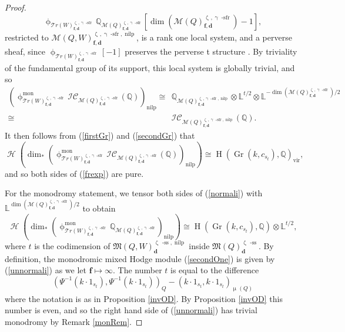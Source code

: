 \documentclass[a4paper,10pt]{amsart}
\newcommand{\dd}{\mathbf{d}}
\newcommand{\ff}{\mathbf{f}}
\newcommand{\LL}{\mathbb{L}}
\newcommand{\QQ}{\mathbb{Q}}
\DeclareMathOperator{\sfr}{-sfr}
\newcommand{\WW}{\mathcal{T}r(W)}
\newcommand{\Mst}{\mathfrak{M}}
\newcommand{\Msp}{\mathcal{M}}
\newcommand{\ICS}{\mathcal{IC}}
\newcommand{\phim}[1]{\phi^{\mon}_{#1}}
\renewcommand{\gamma}{\upgamma}
\renewcommand{\zeta}{\upzeta}
\renewcommand{\phi}{\upphi}
\renewcommand{\mu}{\upmu}
\DeclareMathOperator{\sst}{-ss}
\DeclareMathOperator{\nilp}{nilp}
\DeclareMathOperator{\mon}{mon}
\DeclareMathOperator{\Gr}{Gr}
\DeclareMathOperator{\Ss}{\overline{s}}
\DeclareMathOperator{\vir}{vir}
\DeclareMathOperator{\Ho}{\mathcal{H}}
\DeclareMathOperator{\HO}{H}
\begin{document}
\begin{proof}
\[
\phi_{\WW^{\zeta_{\Ss},\gamma\sfr}_{\ff,\dd}}\QQ_{\Msp(Q)^{\zeta_{\Ss},\gamma\sfr}_{\ff,\dd}}[\dim(\Msp(Q)^{\zeta_{\Ss},\gamma\sfr}_{\ff,\dd}) -1], 
\]
restricted to $\Msp(Q,W)_{\ff,\dd}^{\zeta_{\Ss},\gamma\sfr,\nilp}$, is a rank one local system, and a perverse sheaf, since $\phi_{\WW^{\zeta_{\Ss},\gamma\sfr}_{\ff,\dd}}[-1]$ preserves the perverse t structure \cite{BBD}.  By triviality of the fundamental group of its support, this local system is globally trivial, and so
\begin{align}\label{ZM}
\left(\phim{\WW^{\zeta_{\Ss},\gamma\sfr}_{\ff,\dd}}\ICS_{\Msp(Q)^{\zeta_{\Ss},\gamma\sfr}_{\ff,\dd}}(\mathbb{Q})\right)_{\nilp}\cong&\QQ_{\Msp(Q)^{\zeta_{\Ss},\gamma\sfr,\nilp}_{\ff,\dd}}\otimes\LL^{t/2}\otimes\LL^{-\dim(\Msp(Q)^{\zeta_{\Ss},\gamma\sfr}_{\ff,\dd})/2}\\
\cong & \ICS_{\Msp(Q)^{\zeta_{\Ss},\gamma\sfr,\nilp}_{\ff,\dd}}(\mathbb{Q}).\nonumber
\end{align}
It then follows from (\ref{firstGr}) and (\ref{secondGr}) that 
\begin{equation}
\label{normali}
\Ho\left(\dim_{*}\left(\phim{\WW^{\zeta_{\Ss},\gamma\sfr}_{\ff,\dd}}\ICS_{\Msp(Q)_{\ff,\dd}^{\zeta_{\Ss},\gamma\sfr}}(\mathbb{Q})\right)_{\nilp}\right)\cong\HO(\Gr(k,c_{s_t}),\mathbb{Q})_{\vir},
\end{equation}
and so both sides of (\ref{frexp}) are pure.  

For the monodromy statement, we tensor both sides of (\ref{normali}) with $\LL^{\dim(\Msp(Q)_{\ff,\dd}^{\zeta_{\Ss},\gamma\sfr})/2}$ to obtain
\begin{equation}
\label{unnormali}
\Ho\left(\dim_*\left(\phim{\WW^{\zeta_{\Ss},\gamma\sfr}_{\ff,\dd}}\QQ_{\Msp(Q)_{\ff,\dd}^{\zeta_{\Ss},\gamma\sfr}}\right)_{\nilp}\right)\cong \HO(\Gr(k,c_{s_t}),\mathbb{Q})\otimes\LL^{t/2},
\end{equation}
where $t$ is the codimension of $\Mst(Q,W)_{\dd}^{\zeta_{\Ss}\sst,\nilp}$ inside $\Mst(Q)_{\dd}^{\zeta_{\Ss}\sst}$.  By definition, the monodromic mixed Hodge module (\ref{secondOne}) is given by (\ref{unnormali}) as we let $\ff\mapsto\infty$.  The number $t$ is equal to the difference
\[
(\Psi_{\Ss}^{-1}(k\cdot 1_{s_t}),\Psi_{\Ss}^{-1}(k \cdot 1_{s_t}))_Q-(k\cdot 1_{s_t},k\cdot 1_{s_t})_{\mu_{\Ss}(Q)}
\]
where the notation is as in Proposition \ref{invOD}.  By Proposition \ref{invOD} this number is even, and so the right hand side of (\ref{unnormali}) has trivial monodromy by Remark \ref{monRem}.
\end{proof}
\end{document}
